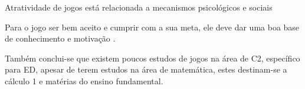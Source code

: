 Atratividade de jogos está relacionada a mecanismos psicológicos e sociais \cite{sucessoJogoEngSoft}

Para o jogo ser bem aceito e cumprir com a sua meta, ele deve dar uma boa base de conhecimento e motivação \cite{sucessoJogoEngSoft}.

Também conclui-se que existem poucos estudos de jogos na área de C2, específico para ED, apesar de terem estudos na área de matemática, estes destinam-se a cálculo 1 e matérias do ensino fundamental.


\begin{comment}
Gamificação foca em elementos como desafios, níveis, avatar, conquistas, histórias, pontos (Gustavo Fortes Tondello, PhD). Esses elementos são utilizados para engajamento do jogador.

Completar missões e derrotar um chefão faz o jogador se sentir competente (Gustavo Fortes Tondello, PhD).
Ser capaz de escolher diferentes caminhos ou criar coisas diferentes faz o jogador se sentir autônomo (Gustavo Fortes Tondello, PhD).
\end{comment}
